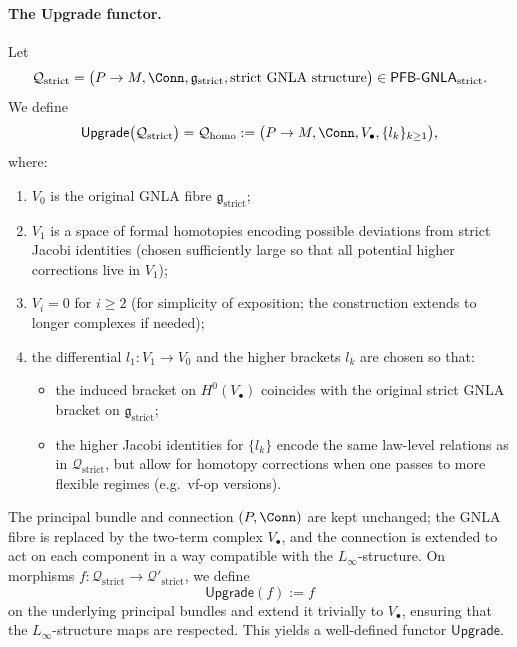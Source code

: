 \documentclass[11pt]{book}
\theoremstyle{plain}
\theoremstyle{definition}
\begin{document}
\paragraph{The Upgrade functor.}
Let
\[
  \mathcal{Q}_{\mathrm{strict}}
  =
  \bigl(P\to M,\Conn,\mathfrak{g}_{\mathrm{strict}},
        \text{strict GNLA structure}\bigr)
  \in
  \mathsf{PFB\text- GNLA}_{\mathrm{strict}}.
\]
We define
\[
  \mathsf{Upgrade}\bigl(\mathcal{Q}_{\mathrm{strict}}\bigr)
  =
  \mathcal{Q}_{\mathrm{homo}}
  :=
  \bigl(P\to M,\Conn,V_\bullet,\{l_k\}_{k\ge 1}\bigr),
\]
where:
\begin{enumerate}
  \item \(V_0\) is the original GNLA fibre
        \(\mathfrak{g}_{\mathrm{strict}}\);
  \item \(V_1\) is a space of formal homotopies encoding possible
        deviations from strict Jacobi identities (chosen sufficiently
        large so that all potential higher corrections live in
        \(V_1\));
  \item \(V_i=0\) for \(i\ge 2\) (for simplicity of exposition; the
        construction extends to longer complexes if needed);
  \item the differential \(l_1:V_1\to V_0\) and the higher brackets
        \(l_k\) are chosen so that:
        \begin{itemize}
          \item the induced bracket on \(H^0(V_\bullet)\) coincides
                with the original strict GNLA bracket on
                \(\mathfrak{g}_{\mathrm{strict}}\);
          \item the higher Jacobi identities for \(\{l_k\}\) encode
                the same law-level relations as in
                \(\mathcal{Q}_{\mathrm{strict}}\), but allow for
                homotopy corrections when one passes to more flexible
                regimes (e.g.\ vf-op versions).
        \end{itemize}
\end{enumerate}
The principal bundle and connection \((P,\Conn)\) are kept unchanged;
the GNLA fibre is replaced by the two-term complex \(V_\bullet\), and
the connection is extended to act on each component in a way compatible
with the \(L_\infty\)-structure.  On morphisms
\(f:\mathcal{Q}_{\mathrm{strict}}\to\mathcal{Q}'_{\mathrm{strict}}\),
we define
\[
  \mathsf{Upgrade}(f)
  := f
\]
on the underlying principal bundles and extend it trivially to
\(V_\bullet\), ensuring that the \(L_\infty\)-structure maps are
respected.  This yields a well-defined functor
\(\mathsf{Upgrade}\).
\end{document}

